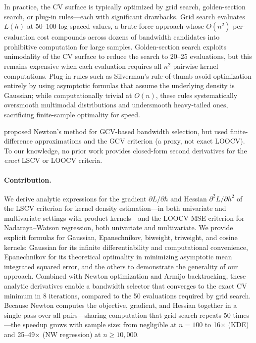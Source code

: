 \documentclass[11pt]{article}
\theoremstyle{definition}
\theoremstyle{remark}
\begin{document}
In practice, the CV surface is typically optimized by grid search, golden-section search, or plug-in rules---each with significant drawbacks.
Grid search evaluates $L(h)$ at 50--100 log-spaced values, a brute-force approach whose $O(n^2)$ per-evaluation cost compounds across dozens of bandwidth candidates into prohibitive computation for large samples.
Golden-section search exploits unimodality of the CV surface to reduce the search to 20--25 evaluations, but this remains expensive when each evaluation requires all $n^2$ pairwise kernel computations.
Plug-in rules such as Silverman's rule-of-thumb avoid optimization entirely by using asymptotic formulas that assume the underlying density is Gaussian; while computationally trivial at $O(n)$, these rules systematically oversmooth multimodal distributions and undersmooth heavy-tailed ones, sacrificing finite-sample optimality for speed.

\citet{chiu1992bandwidth} proposed Newton's method for GCV-based bandwidth selection, but used finite-difference approximations and the GCV criterion (a proxy, not exact LOOCV).
To our knowledge, no prior work provides closed-form second derivatives for the \emph{exact} LSCV or LOOCV criteria.

\paragraph{Contribution.}
We derive analytic expressions for the gradient $\partial L / \partial h$ and Hessian $\partial^2 L / \partial h^2$ of the LSCV criterion for kernel density estimation---in both univariate and multivariate settings with product kernels---and the LOOCV-MSE criterion for Nadaraya--Watson regression, both univariate and multivariate.
We provide explicit formulas for Gaussian, Epanechnikov, biweight, triweight, and cosine kernels: Gaussian for its infinite differentiability and computational convenience, Epanechnikov for its theoretical optimality in minimizing asymptotic mean integrated squared error, and the others to demonstrate the generality of our approach.
Combined with Newton optimization and Armijo backtracking, these analytic derivatives enable a bandwidth selector that converges to the exact CV minimum in 8 iterations, compared to the 50 evaluations required by grid search.
Because Newton computes the objective, gradient, and Hessian together in a single pass over all pairs---sharing computation that grid search repeats 50 times---the speedup grows with sample size: from negligible at $n=100$ to 16$\times$ (KDE) and 25--49$\times$ (NW regression) at $n \geq 10{,}000$.
\end{document}
